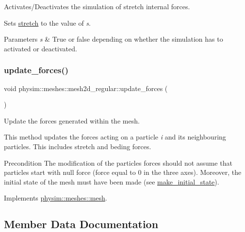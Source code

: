 Activates/\+Deactivates the simulation of stretch internal forces. 

Sets \hyperlink{classphysim_1_1meshes_1_1mesh2d__regular_a3101edd8212afd9a35ad11c6666e26be}{stretch} to the value of {\itshape s}. 
\begin{DoxyParams}{Parameters}
{\em s} & True or false depending on whether the simulation has to activated or deactivated. \\
\hline
\end{DoxyParams}
\mbox{\label{classphysim_1_1meshes_1_1mesh2d__regular_aaf4e82b9231d79624224c3462cc18809}} 
\subsubsection{\texorpdfstring{update\+\_\+forces()}{update\_forces()}}
{\footnotesize\ttfamily void physim\+::meshes\+::mesh2d\+\_\+regular\+::update\+\_\+forces (\begin{DoxyParamCaption}{ }\end{DoxyParamCaption})\hspace{0.3cm}{\ttfamily [virtual]}}



Update the forces generated within the mesh. 

This method updates the forces acting on a particle {\itshape i} and its neighbouring particles. This includes stretch and beding forces.

\begin{DoxyPrecond}{Precondition}
The modification of the particle\textquotesingle{}s forces should not assume that particles start with null force (force equal to 0 in the three axes). Moreover, the initial state of the mesh must have been made (see \hyperlink{classphysim_1_1meshes_1_1mesh2d__regular_ab05d404566850dd5a2d11814c3c25186}{make\+\_\+initial\+\_\+state}). 
\end{DoxyPrecond}


Implements \hyperlink{classphysim_1_1meshes_1_1mesh_ad7cad4cd454cce562c8c404ef09f8bd3}{physim\+::meshes\+::mesh}.



\subsection{Member Data Documentation}
\mbox{\label{classphysim_1_1meshes_1_1mesh2d__regular_ac3a70b7b6b37942d5174ddcc90703993}} 
